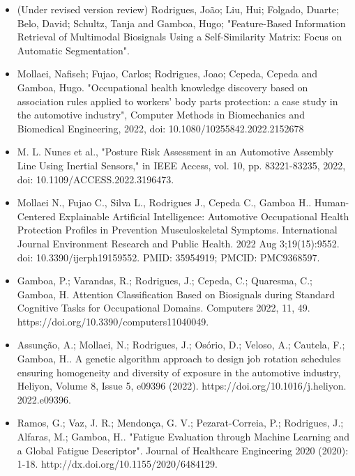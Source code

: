 \begin{itemize}

\item (Under revised version review) Rodrigues, João; Liu, Hui; Folgado, Duarte; Belo, David; Schultz, Tanja and Gamboa, Hugo;  "Feature-Based Information Retrieval of Multimodal Biosignals Using a Self-Similarity Matrix: Focus on Automatic Segmentation".

\item Mollaei, Nafiseh; Fujao, Carlos; Rodrigues, Joao; Cepeda, Cepeda and Gamboa, Hugo. "Occupational health knowledge discovery based on association rules applied to workers’ body parts protection: a case study in the automotive industry", Computer Methods in Biomechanics and Biomedical Engineering, 2022, doi: 10.1080/10255842.2022.2152678

\item M. L. Nunes et al., "Posture Risk Assessment in an Automotive Assembly Line Using Inertial Sensors," in IEEE Access, vol. 10, pp. 83221-83235, 2022, doi: 10.1109/ACCESS.2022.3196473.

\item Mollaei N., Fujao C., Silva L., Rodrigues J., Cepeda C., Gamboa H.. Human-Centered Explainable Artificial Intelligence: Automotive Occupational Health Protection Profiles in Prevention Musculoskeletal Symptoms. International Journal Environment Research and Public Health. 2022 Aug 3;19(15):9552. doi: 10.3390/ijerph19159552. PMID: 35954919; PMCID: PMC9368597.

\item Gamboa, P.; Varandas, R.; Rodrigues, J.; Cepeda, C.; Quaresma, C.; Gamboa, H. Attention Classification Based on Biosignals during Standard Cognitive Tasks for Occupational Domains. Computers 2022, 11, 49. https://doi.org/10.3390/computers11040049.

\item Assunção, A.; Mollaei, N.; Rodrigues, J.; Osório, D.; Veloso, A.; Cautela, F.; Gamboa, H.. A genetic algorithm approach to design job rotation schedules ensuring homogeneity and diversity of exposure in the automotive industry, Heliyon, Volume 8, Issue 5, e09396 (2022). https://doi.org/10.1016/j.heliyon.
2022.e09396.

\item Ramos, G.; Vaz, J. R.; Mendonça, G. V.; Pezarat-Correia, P.; Rodrigues, J.; Alfaras, M.; Gamboa, H.. "Fatigue Evaluation through Machine Learning and a Global Fatigue Descriptor". Journal of Healthcare Engineering 2020 (2020): 1-18. http://dx.doi.org/10.1155/2020/6484129.


\end{itemize}
